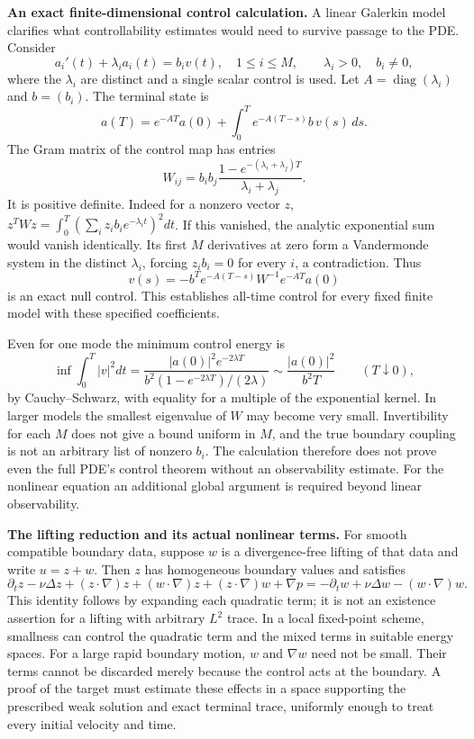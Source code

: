 \documentclass[11pt]{article}
\begin{document}
\textbf{An exact finite-dimensional control calculation.}
A linear Galerkin model clarifies what controllability estimates would need
to survive passage to the PDE.  Consider
\[
 a_i'(t)+\lambda_i a_i(t)=b_i v(t),\quad 1\leq i\leq M,
 \qquad \lambda_i>0,\quad b_i\ne0,
\]
where the $\lambda_i$ are distinct and a single scalar control is used.
Let $A=\operatorname{diag}(\lambda_i)$ and $b=(b_i)$.
The terminal state is
\[
 a(T)=e^{-AT}a(0)+\int_0^T e^{-A(T-s)}b\,v(s)\,ds.
\]
The Gram matrix of the control map has entries
\[
 W_{ij}=b_ib_j\frac{1-e^{-(\lambda_i+\lambda_j)T}}
                         {\lambda_i+\lambda_j}.
\]
It is positive definite.  Indeed for a nonzero vector $z$,
$z^TWz=\int_0^T(\sum_i z_ib_i e^{-\lambda_i t})^2dt$.
If this vanished, the analytic exponential sum would vanish identically.
Its first $M$ derivatives at zero form a Vandermonde system in the distinct
$\lambda_i$, forcing $z_i b_i=0$ for every $i$, a contradiction.
Thus
\[
 v(s)=-b^Te^{-A(T-s)}W^{-1}e^{-AT}a(0)
\]
is an exact null control.  This establishes all-time control for every fixed
finite model with these specified coefficients.

Even for one mode the minimum control energy is
\[
 \inf\int_0^T|v|^2dt
 =\frac{|a(0)|^2e^{-2\lambda T}}
        {b^2(1-e^{-2\lambda T})/(2\lambda)}
 \sim\frac{|a(0)|^2}{b^2T}\qquad(T\downarrow0),
\]
by Cauchy--Schwarz, with equality for a multiple of the exponential kernel.
In larger models the smallest eigenvalue of $W$ may become very small.
Invertibility for each $M$ does not give a bound uniform in $M$, and the
true boundary coupling is not an arbitrary list of nonzero $b_i$.
The calculation therefore does not prove even the full PDE's control theorem
without an observability estimate.  For the nonlinear equation an additional
global argument is required beyond linear observability.

\textbf{The lifting reduction and its actual nonlinear terms.}
For smooth compatible boundary data, suppose $w$ is a divergence-free lifting
of that data and write $u=z+w$.  Then $z$ has homogeneous boundary values and
satisfies
\[
 \partial_tz-\nu\Delta z+(z\cdot\nabla)z
 +(w\cdot\nabla)z+(z\cdot\nabla)w+\nabla p
 =-\partial_tw+\nu\Delta w-(w\cdot\nabla)w.
\]
This identity follows by expanding each quadratic term; it is not an existence
assertion for a lifting with arbitrary $L^2$ trace.  In a local fixed-point
scheme, smallness can control the quadratic term and the mixed terms in
suitable energy spaces.  For a large rapid boundary motion, $w$ and
$\nabla w$ need not be small.  Their terms cannot be discarded merely because
the control acts at the boundary.  A proof of the target must estimate these
effects in a space supporting the prescribed weak solution and exact terminal
trace, uniformly enough to treat every initial velocity and time.
\end{document}

